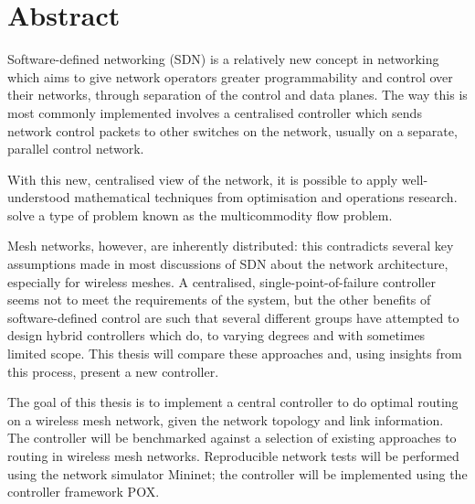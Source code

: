 \chapter{Abstract}

Software-defined networking (SDN) is a relatively new concept in networking which aims to give network operators greater programmability and control over their networks, through separation of the control and data planes. The way this is most commonly implemented involves a centralised controller which sends network control packets to other switches on the network, usually on a separate, parallel control network. 

With this new, centralised view of the network, it is possible to apply well-understood mathematical techniques from optimisation and operations research. solve a type of problem known as the multicommodity flow problem. 

Mesh networks, however, are inherently distributed: this contradicts several key assumptions made in most discussions of SDN about the network architecture, especially for wireless meshes. A centralised, single-point-of-failure controller seems not to meet the requirements of the system, but the other benefits of software-defined control are such that several different groups have attempted to design hybrid controllers which do, to varying degrees and with sometimes limited scope. This thesis will compare these approaches and, using insights from this process, present a new controller.

The goal of this thesis is to implement a central controller to do optimal routing on a wireless mesh network, given the network topology and link information. The controller will be benchmarked against a selection of existing approaches to routing in wireless mesh networks. Reproducible network tests will be performed using the network simulator Mininet; the controller will be implemented using the controller framework POX.
